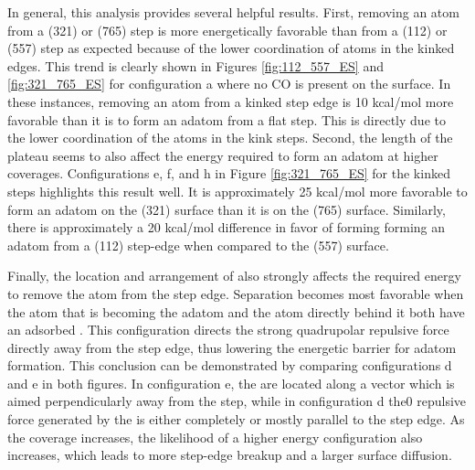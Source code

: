 In general, this analysis provides several helpful results. First, removing an
atom from a (321) or (765) step is more energetically favorable than from a
(112) or (557) step as expected because of the lower coordination of atoms in
the kinked edges. This trend is clearly shown in Figures \ref{fig:112_557_ES}
and \ref{fig:321_765_ES} for configuration a where no CO is present on the
surface. In these instances, removing an atom from a kinked step edge is 10
kcal/mol more favorable than it is to form an adatom from a flat step. This is
directly due to the lower coordination of the atoms in the kink steps.
Second, the length of the plateau seems to also affect the energy required to form
an adatom at higher coverages.  Configurations e, f, and h in Figure
\ref{fig:321_765_ES} for the kinked steps highlights this result well. It is
approximately 25 kcal/mol more favorable to form an adatom on the (321) surface
than it is on the (765) surface. Similarly, there is approximately a 20
kcal/mol difference in favor of forming  forming an adatom from a (112) step-edge when
compared to the (557) surface.

Finally, the location and arrangement of  also strongly affects the
required energy to remove the atom from the step edge. Separation becomes most
favorable when the atom that is becoming the adatom and the atom directly
behind it both have an adsorbed . This configuration directs the strong
quadrupolar repulsive force directly away from the step edge, thus lowering the
energetic barrier for adatom formation.  This conclusion can be demonstrated by
comparing configurations d and e in both figures. In configuration e, the
 are located along a vector which is aimed perpendicularly away from the
step, while in configuration d the0 repulsive force generated by the  is
either completely or mostly parallel to the step edge. As the coverage
increases, the likelihood of a higher energy configuration also increases,
which leads to more step-edge breakup and a larger surface diffusion.

